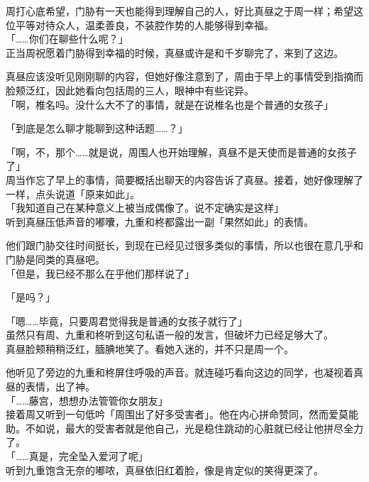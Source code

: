 周打心底希望，门胁有一天也能得到理解自己的人，好比真昼之于周一样；希望这位平等对待众人，温柔善良，不装腔作势的人能够得到幸福。\\

「……你们在聊些什么呢？」\\

正当周祝愿着门胁得到幸福的时候，真昼或许是和千岁聊完了，来到了这边。

真昼应该没听见刚刚聊的内容，但她好像注意到了，周由于早上的事情受到指摘而脸颊泛红，因此她看向包括周的三人，眼神中有些诧异。\\

「啊，椎名吗。没什么大不了的事情，就是在说椎名也是个普通的女孩子」

「到底是怎么聊才能聊到这种话题……？」

「啊，不，那个……就是说，周围人也开始理解，真昼不是天使而是普通的女孩子了」\\

周当作忘了早上的事情，简要概括出聊天的内容告诉了真昼。接着，她好像理解了一样，点头说道「原来如此」。\\

「我知道自己在某种意义上被当成偶像了。说不定确实是这样」\\

听到真昼压低声音的嘟囔，九重和柊都露出一副「果然如此」的表情。

他们跟门胁交往时间挺长，到现在已经见过很多类似的事情，所以也很在意几乎和门胁是同类的真昼吧。\\

「但是，我已经不那么在乎他们那样说了」

「是吗？」

「嗯……毕竟，只要周君觉得我是普通的女孩子就行了」\\

虽然只有周、九重和柊听到这句私语一般的发言，但破坏力已经足够大了。\\

真昼脸颊稍稍泛红，腼腆地笑了。看她入迷的，并不只是周一个。

他听见了旁边的九重和柊屏住呼吸的声音。就连碰巧看向这边的同学，也凝视着真昼的表情，出了神。\\

「……藤宫，想想办法管管你女朋友」\\

接着周又听到一句低吟「周围出了好多受害者」。他在内心拼命赞同，然而爱莫能助。不如说，最大的受害者就是他自己，光是稳住跳动的心脏就已经让他拼尽全力了。\\

「……真是，完全坠入爱河了呢」\\

听到九重饱含无奈的嘟哝，真昼依旧红着脸，像是肯定似的笑得更深了。
